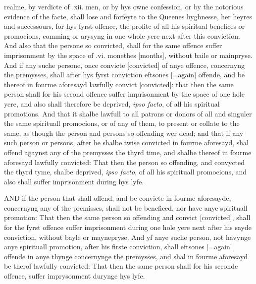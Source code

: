 realme, by verdicte of .xii. men, or by hys owne confession, or by the
notorious evidence of the facte, shall lose and forfeyte to the Queenes
hyghnesse, her heyres and successours, for hys fyrst offence, the profite
of all his spiritual benefices or promocions, comming or arysyng in
one whole yere next after this conviction. And also that the persone
so convicted, shall for the same offence suffer imprisonment by the
space of .vi. monethes [months],
without baile or mainpryse. And if any suche persone, once convicte
[convicted] of anye offence,
concernyng the premysses, shall after hys fyrst conviction eftsones
[=again] offende, and be thereof
in fourme aforesayd lawfully convict [convicted]:
that then the same person shall for his second offence suffer imprisonment
by the space of one hole yere, and also shall therefore be deprived,
\emph{ipso facto}, of all his spiritual promotions. And that it shalbe
lawfull to all patrons or donors of all and singuler the same spirituall
promocions, or of any of them, to present or collate to the same, as
though the person and persons so offending wer dead; and that if any
such person or persons, after he shalbe twise convicted in fourme aforesayd,
shal offend agaynst any of the premysses the thyrd time, and shalbe
thereof in fourme aforesayd lawfully convicted: That then the person
so offending, and convycted the thyrd tyme, shalbe deprived, \emph{ipso
facto}, of all his spirituall promocions, and also shall suffer imprisonment
during hys lyfe.

AND if the person that shall
offend, and be convicte in fourme aforesayde, concernyng any of the
premisses, shall not be beneficed, nor have anye spirituall promotion:
That then the same person so offending and convict [convicted],
shall for the fyrst offence suffer imprisonment during one hole yere
next after his sayde conviction, without bayle or maynepryse. And yf
anye suche person, not havynge anye spirituall promotion, after his
firste conviction, shall eftsones [=again]
offende in anye thynge concernynge the premysses, and shal in fourme
aforesayd be therof lawfully convicted: That then the same person shall
for his seconde offence, suffer imprysonment durynge hys lyfe.

